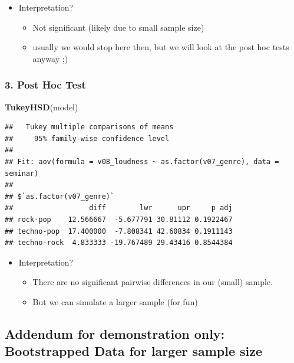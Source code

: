 \documentclass[
]{book}
\newenvironment{Shaded}{\begin{snugshade}}{\end{snugshade}}
\newcommand{\FunctionTok}[1]{\textcolor[rgb]{0.13,0.29,0.53}{\textbf{#1}}}
\newcommand{\NormalTok}[1]{#1}
\providecommand{\tightlist}{%
  \setlength{\itemsep}{0pt}\setlength{\parskip}{0pt}}
\begin{document}
\begin{itemize}
\tightlist
\item
  Interpretation?

  \begin{itemize}
  \tightlist
  \item
    Not significant (likely due to small sample size)
  \item
    usually we would stop here then, but we will look at the post hoc tests anyway ;)
  \end{itemize}
\end{itemize}

\subsubsection{3. Post Hoc Test}\label{post-hoc-test}

\begin{Shaded}
\begin{Highlighting}[]
\FunctionTok{TukeyHSD}\NormalTok{(model)}
\end{Highlighting}
\end{Shaded}

\begin{verbatim}
##   Tukey multiple comparisons of means
##     95% family-wise confidence level
## 
## Fit: aov(formula = v08_loudness ~ as.factor(v07_genre), data = seminar)
## 
## $`as.factor(v07_genre)`
##                  diff        lwr      upr     p adj
## rock-pop    12.566667  -5.677791 30.81112 0.1922467
## techno-pop  17.400000  -7.808341 42.60834 0.1911143
## techno-rock  4.833333 -19.767489 29.43416 0.8544384
\end{verbatim}

\begin{itemize}
\tightlist
\item
  Interpretation?

  \begin{itemize}
  \tightlist
  \item
    There are no significant pairwise differences in our (small) sample.
  \item
    But we can simulate a larger sample (for fun)
  \end{itemize}
\end{itemize}

\subsection{Addendum for demonstration only: Bootstrapped Data for larger sample size}\label{addendum-for-demonstration-only-bootstrapped-data-for-larger-sample-size}
\end{document}
